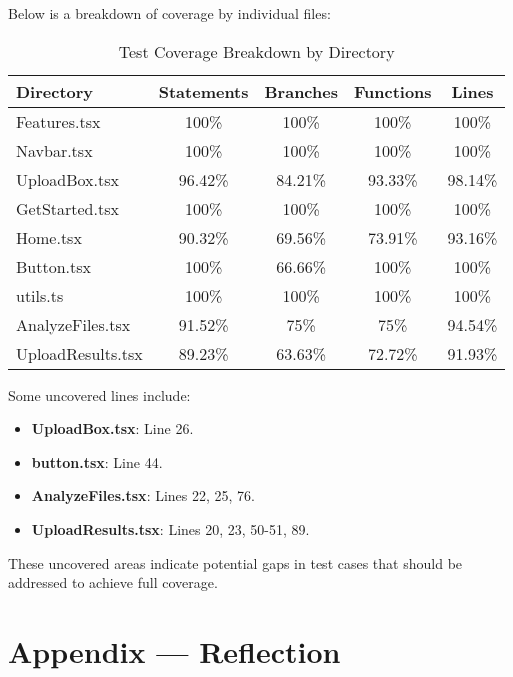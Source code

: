 \documentclass[12pt, titlepage]{article}
\begin{document}
\newpage

Below is a breakdown of coverage by individual files:

\begin{table}[h]
    \centering
    \begin{tabular}{|l|c|c|c|c|}
    \hline
    \textbf{Directory} & \textbf{Statements} & \textbf{Branches} & \textbf{Functions} & \textbf{Lines} \\
    \hline
    Features.tsx & 100\% & 100\% & 100\% & 100\% \\
    Navbar.tsx & 100\% & 100\% & 100\% & 100\% \\
    UploadBox.tsx & 96.42\% & 84.21\% & 93.33\% & 98.14\% \\
    GetStarted.tsx & 100\% & 100\% & 100\% & 100\% \\
    Home.tsx & 90.32\% & 69.56\% & 73.91\% & 93.16\% \\
    Button.tsx & 100\% & 66.66\% & 100\% & 100\% \\
    utils.ts & 100\% & 100\% & 100\% & 100\% \\
    AnalyzeFiles.tsx & 91.52\% & 75\% & 75\% & 94.54\% \\
    UploadResults.tsx & 89.23\% & 63.63\% & 72.72\% & 91.93\% \\
    \hline
    \end{tabular}
    \caption{Test Coverage Breakdown by Directory}
    \label{tab:coverage}
\end{table}

Some uncovered lines include:

\begin{itemize}
\item \textbf{UploadBox.tsx}: Line 26.
\item \textbf{button.tsx}: Line 44.
\item \textbf{AnalyzeFiles.tsx}: Lines 22, 25, 76.
\item \textbf{UploadResults.tsx}: Lines 20, 23, 50-51, 89.
\end{itemize}

These uncovered areas indicate potential gaps in test cases that should be addressed to achieve full coverage.




\newpage{}
\section*{Appendix --- Reflection}
\end{document}
